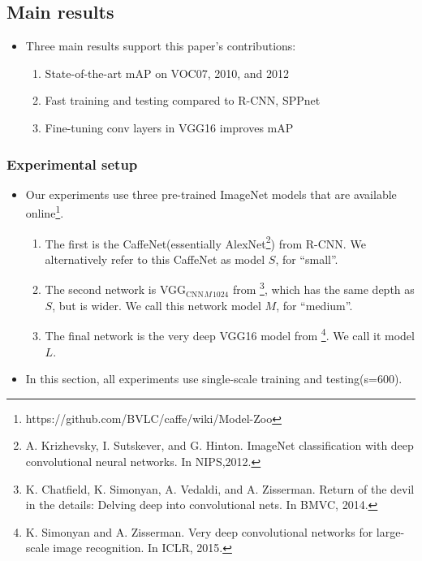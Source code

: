 \documentclass[11pt]{article}
\begin{document}
\subsection{Main results}
\label{sec-1-3}


\begin{itemize}
\item Three main results support this paper's contributions:
\begin{enumerate}
\item State-of-the-art mAP on VOC07, 2010, and 2012
\item Fast training and testing compared to R-CNN, SPPnet
\item Fine-tuning conv layers in VGG16 improves mAP
\end{enumerate}
\end{itemize}
\subsubsection{Experimental setup}
\label{sec-1-3-1}

\begin{itemize}
\item Our experiments use three pre-trained ImageNet models that are available online\footnote{https://github.com/BVLC/caffe/wiki/Model-Zoo
 }.
\begin{enumerate}
\item The first is the CaffeNet(essentially AlexNet\footnote{A. Krizhevsky, I. Sutskever, and G. Hinton.  
ImageNet classification with deep convolutional neural networks. 
In NIPS,2012.
 }) from R-CNN\footnotemark[1]. We alternatively
         refer to this CaffeNet as model $S$, for ``small''.
\item The second network is VGG$_{\mathrm{CNN}}$$_M$$_{\mathrm{1024}}$ from \footnote{K. Chatfield, K. Simonyan, A. Vedaldi, and A. Zisserman.
Return of the devil in the details:  Delving deep into convolutional nets. 
In BMVC, 2014.
 }, which has the same depth as $S$,
         but is wider. We call this network model $M$, for ``medium''.
\item The final network is the very deep VGG16 model from \footnote{K.  Simonyan  and  A.  Zisserman.   
Very  deep  convolutional networks for large-scale image recognition.  
In ICLR, 2015.
 }. We call  it model $L$.
\end{enumerate}
\item In this section, all experiments use single-scale training and testing(s=600).
\end{itemize}
\end{document}
